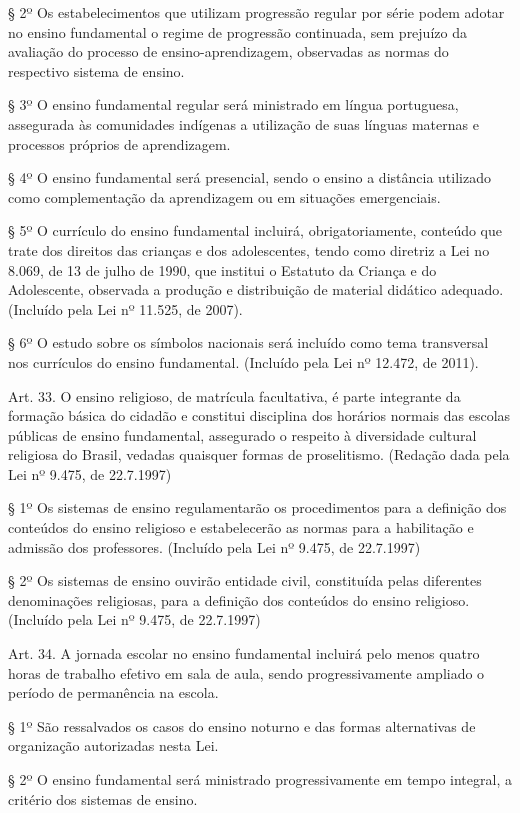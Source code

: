 \documentclass[
]{book}
\begin{document}
§ 2º Os estabelecimentos que utilizam progressão regular por série podem adotar no ensino fundamental o regime de progressão continuada, sem prejuízo da avaliação do processo de ensino-aprendizagem, observadas as normas do respectivo sistema de ensino.

§ 3º O ensino fundamental regular será ministrado em língua portuguesa, assegurada às comunidades indígenas a utilização de suas línguas maternas e processos próprios de aprendizagem.

§ 4º O ensino fundamental será presencial, sendo o ensino a distância utilizado como complementação da aprendizagem ou em situações emergenciais.

§ 5º O currículo do ensino fundamental incluirá, obrigatoriamente, conteúdo que trate dos direitos das crianças e dos adolescentes, tendo como diretriz a Lei no 8.069, de 13 de julho de 1990, que institui o Estatuto da Criança e do Adolescente, observada a produção e distribuição de material didático adequado. (Incluído pela Lei nº 11.525, de 2007).

§ 6º O estudo sobre os símbolos nacionais será incluído como tema transversal nos currículos do ensino fundamental. (Incluído pela Lei nº 12.472, de 2011).

Art. 33. O ensino religioso, de matrícula facultativa, é parte integrante da formação básica do cidadão e constitui disciplina dos horários normais das escolas públicas de ensino fundamental, assegurado o respeito à diversidade cultural religiosa do Brasil, vedadas quaisquer formas de proselitismo. (Redação dada pela Lei nº 9.475, de 22.7.1997)

§ 1º Os sistemas de ensino regulamentarão os procedimentos para a definição dos conteúdos do ensino religioso e estabelecerão as normas para a habilitação e admissão dos professores. (Incluído pela Lei nº 9.475, de 22.7.1997)

§ 2º Os sistemas de ensino ouvirão entidade civil, constituída pelas diferentes denominações religiosas, para a definição dos conteúdos do ensino religioso. (Incluído pela Lei nº 9.475, de 22.7.1997)

Art. 34. A jornada escolar no ensino fundamental incluirá pelo menos quatro horas de trabalho efetivo em sala de aula, sendo progressivamente ampliado o período de permanência na escola.

§ 1º São ressalvados os casos do ensino noturno e das formas alternativas de organização autorizadas nesta Lei.

§ 2º O ensino fundamental será ministrado progressivamente em tempo integral, a critério dos sistemas de ensino.
\end{document}
